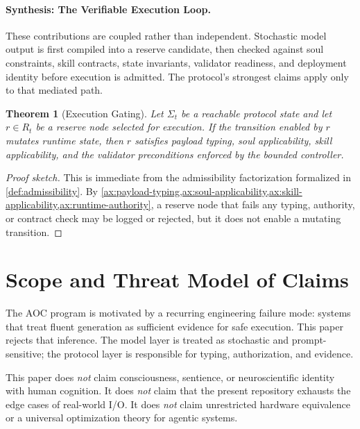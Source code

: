 \documentclass[11pt]{article}
\newtheorem{theorem}{Theorem}[section]
\theoremstyle{remark}
\newcommand{\AOC}{\textup{\textsc{AOC}}}
\begin{document}
\paragraph{Synthesis: The Verifiable Execution Loop.}
These contributions are coupled rather than independent. Stochastic model output is first compiled into a reserve candidate, then checked against soul constraints, skill contracts, state invariants, validator readiness, and deployment identity before execution is admitted. The protocol's strongest claims apply only to that mediated path.

\begin{theorem}[Execution Gating]
Let \(\Sigma_t\) be a reachable protocol state and let \(r\in R_t\) be a reserve node selected for execution. If the transition enabled by \(r\) mutates runtime state, then \(r\) satisfies payload typing, soul applicability, skill applicability, and the validator preconditions enforced by the bounded controller.
\end{theorem}

\begin{proof}[Proof sketch]
This is immediate from the admissibility factorization formalized in \cref{def:admissibility}. By \cref{ax:payload-typing,ax:soul-applicability,ax:skill-applicability,ax:runtime-authority}, a reserve node that fails any typing, authority, or contract check may be logged or rejected, but it does not enable a mutating transition.
\end{proof}

\section*{Scope and Threat Model of Claims}

The \AOC{} program is motivated by a recurring engineering failure mode: systems that treat fluent generation as sufficient evidence for safe execution. This paper rejects that inference. The model layer is treated as stochastic and prompt-sensitive; the protocol layer is responsible for typing, authorization, and evidence.

This paper does \emph{not} claim consciousness, sentience, or neuroscientific identity with human cognition. It does \emph{not} claim that the present repository exhausts the edge cases of real-world I/O. It does \emph{not} claim unrestricted hardware equivalence or a universal optimization theory for agentic systems.
\end{document}
